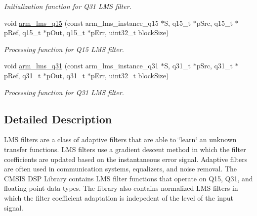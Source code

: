 \begin{DoxyCompactItemize}
\begin{DoxyCompactList}\small\item\em Initialization function for Q31 L\+MS filter. \end{DoxyCompactList}\item 
void \hyperlink{group__LMS_gacde16c17eb75979f81b34e2e2a58c7ac}{arm\+\_\+lms\+\_\+q15} (const arm\+\_\+lms\+\_\+instance\+\_\+q15 $\ast$S, q15\+\_\+t $\ast$p\+Src, q15\+\_\+t $\ast$p\+Ref, q15\+\_\+t $\ast$p\+Out, q15\+\_\+t $\ast$p\+Err, uint32\+\_\+t block\+Size)
\begin{DoxyCompactList}\small\item\em Processing function for Q15 L\+MS filter. \end{DoxyCompactList}\item 
void \hyperlink{group__LMS_ga6a0abfe6041253a6f91c63b383a64257}{arm\+\_\+lms\+\_\+q31} (const arm\+\_\+lms\+\_\+instance\+\_\+q31 $\ast$S, q31\+\_\+t $\ast$p\+Src, q31\+\_\+t $\ast$p\+Ref, q31\+\_\+t $\ast$p\+Out, q31\+\_\+t $\ast$p\+Err, uint32\+\_\+t block\+Size)
\begin{DoxyCompactList}\small\item\em Processing function for Q31 L\+MS filter. \end{DoxyCompactList}\end{DoxyCompactItemize}


\subsection{Detailed Description}
L\+MS filters are a class of adaptive filters that are able to \char`\"{}learn\char`\"{} an unknown transfer functions. L\+MS filters use a gradient descent method in which the filter coefficients are updated based on the instantaneous error signal. Adaptive filters are often used in communication systems, equalizers, and noise removal. The C\+M\+S\+IS D\+SP Library contains L\+MS filter functions that operate on Q15, Q31, and floating-\/point data types. The library also contains normalized L\+MS filters in which the filter coefficient adaptation is indepedent of the level of the input signal.

